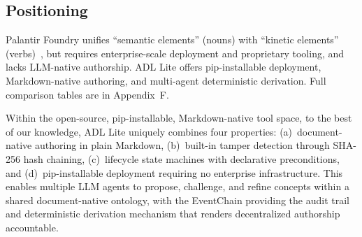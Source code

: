 \subsection{Positioning}\label{subsec:related-positioning}

Palantir Foundry unifies ``semantic elements'' (nouns) with ``kinetic elements'' (verbs)~\cite{palantir_fde}, but requires enterprise-scale deployment and proprietary tooling, and lacks LLM-native authorship. ADL Lite offers pip-installable deployment, Markdown-native authoring, and multi-agent deterministic derivation. Full comparison tables are in Appendix~F.

Within the open-source, pip-installable, Markdown-native tool space, to the best of our knowledge, ADL Lite uniquely combines four properties: (a)~document-native authoring in plain Markdown, (b)~built-in tamper detection through SHA-256 hash chaining, (c)~lifecycle state machines with declarative preconditions, and (d)~pip-installable deployment requiring no enterprise infrastructure. This enables multiple LLM agents to propose, challenge, and refine concepts within a shared document-native ontology, with the EventChain providing the audit trail and deterministic derivation mechanism that renders decentralized authorship accountable.
